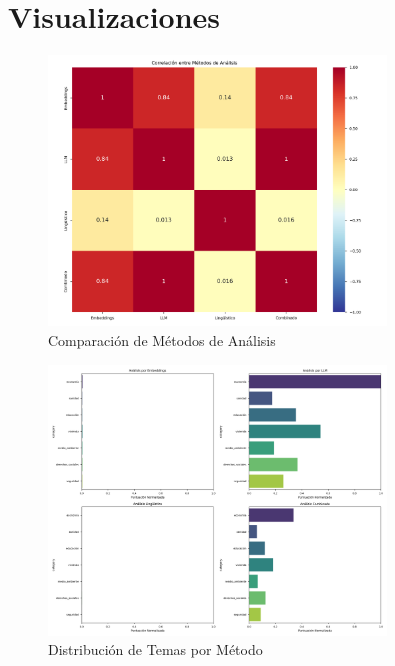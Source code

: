 \documentclass[12pt,a4paper]{article}
\begin{document}
\section{Visualizaciones}

\begin{figure}[H]
    \centering
    \includegraphics[width=0.8\textwidth]{ method_comparison.png }
    \caption{ Comparación de Métodos de Análisis }
    \label{fig:method_comparison}
\end{figure}

\begin{figure}[H]
    \centering
    \includegraphics[width=0.8\textwidth]{ topic_distribution_by_method.png }
    \caption{ Distribución de Temas por Método }
    \label{fig:topic_distribution_by_method}
\end{figure}
\end{document}
